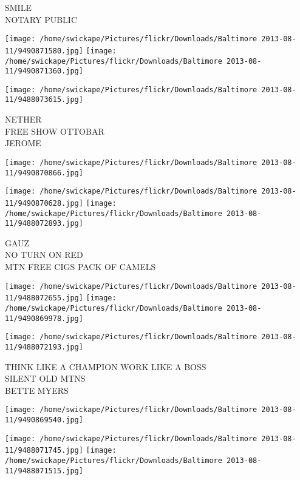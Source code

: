 \documentclass[10pt,letterpaper]{article}
\begin{document}
SMILE\\
NOTARY PUBLIC\\
\pagebreak

\texttt{[image: /home/swickape/Pictures/flickr/Downloads/Baltimore 2013-08-11/9490871580.jpg]}
\texttt{[image: /home/swickape/Pictures/flickr/Downloads/Baltimore 2013-08-11/9490871360.jpg]}

\vspace{0.25in}
\texttt{[image: /home/swickape/Pictures/flickr/Downloads/Baltimore 2013-08-11/9488073615.jpg]}

NETHER\\
FREE SHOW OTTOBAR\\
JEROME\\
\pagebreak

\texttt{[image: /home/swickape/Pictures/flickr/Downloads/Baltimore 2013-08-11/9490870866.jpg]}

\vspace{0.25in}
\texttt{[image: /home/swickape/Pictures/flickr/Downloads/Baltimore 2013-08-11/9490870628.jpg]}
\texttt{[image: /home/swickape/Pictures/flickr/Downloads/Baltimore 2013-08-11/9488072893.jpg]}

GAUZ\\
NO TURN ON RED\\
MTN FREE CIGS PACK OF CAMELS\\
\pagebreak

\texttt{[image: /home/swickape/Pictures/flickr/Downloads/Baltimore 2013-08-11/9488072655.jpg]}
\texttt{[image: /home/swickape/Pictures/flickr/Downloads/Baltimore 2013-08-11/9490869978.jpg]}

\texttt{[image: /home/swickape/Pictures/flickr/Downloads/Baltimore 2013-08-11/9488072193.jpg]}

THINK LIKE A CHAMPION WORK LIKE A BOSS\\
SILENT OLD MTNS\\
BETTE MYERS\\
\pagebreak

\texttt{[image: /home/swickape/Pictures/flickr/Downloads/Baltimore 2013-08-11/9490869540.jpg]}

\vspace{0.25in}
\texttt{[image: /home/swickape/Pictures/flickr/Downloads/Baltimore 2013-08-11/9488071745.jpg]}
\texttt{[image: /home/swickape/Pictures/flickr/Downloads/Baltimore 2013-08-11/9488071515.jpg]}
\end{document}
